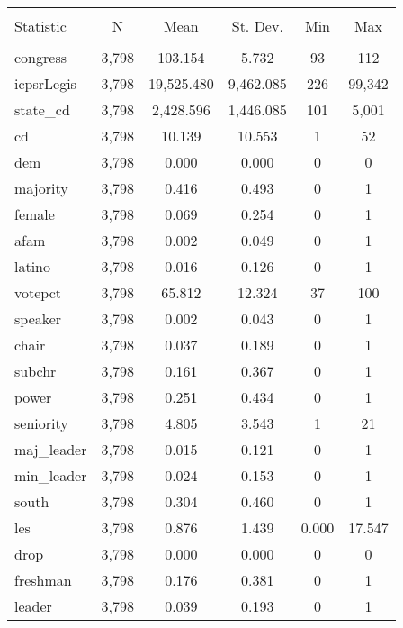 \documentclass[12pt]{article}
\begin{document}
\begin{table}[!htbp] \centering 
	\caption{} 
	\label{} 
	\begin{tabular}{@{\extracolsep{5pt}}lccccc} 
		\\[-1.8ex]\hline 
		\hline \\[-1.8ex] 
		Statistic & \multicolumn{1}{c}{N} & \multicolumn{1}{c}{Mean} & \multicolumn{1}{c}{St. Dev.} & \multicolumn{1}{c}{Min} & \multicolumn{1}{c}{Max} \\ 
		\hline \\[-1.8ex] 
		congress & 3,798 & 103.154 & 5.732 & 93 & 112 \\ 
		icpsrLegis & 3,798 & 19,525.480 & 9,462.085 & 226 & 99,342 \\ 
		state\_cd & 3,798 & 2,428.596 & 1,446.085 & 101 & 5,001 \\ 
		cd & 3,798 & 10.139 & 10.553 & 1 & 52 \\ 
		dem & 3,798 & 0.000 & 0.000 & 0 & 0 \\ 
		majority & 3,798 & 0.416 & 0.493 & 0 & 1 \\ 
		female & 3,798 & 0.069 & 0.254 & 0 & 1 \\ 
		afam & 3,798 & 0.002 & 0.049 & 0 & 1 \\ 
		latino & 3,798 & 0.016 & 0.126 & 0 & 1 \\ 
		votepct & 3,798 & 65.812 & 12.324 & 37 & 100 \\ 
		speaker & 3,798 & 0.002 & 0.043 & 0 & 1 \\ 
		chair & 3,798 & 0.037 & 0.189 & 0 & 1 \\ 
		subchr & 3,798 & 0.161 & 0.367 & 0 & 1 \\ 
		power & 3,798 & 0.251 & 0.434 & 0 & 1 \\ 
		seniority & 3,798 & 4.805 & 3.543 & 1 & 21 \\ 
		maj\_leader & 3,798 & 0.015 & 0.121 & 0 & 1 \\ 
		min\_leader & 3,798 & 0.024 & 0.153 & 0 & 1 \\ 
		south & 3,798 & 0.304 & 0.460 & 0 & 1 \\ 
		les & 3,798 & 0.876 & 1.439 & 0.000 & 17.547 \\ 
		drop & 3,798 & 0.000 & 0.000 & 0 & 0 \\ 
		freshman & 3,798 & 0.176 & 0.381 & 0 & 1 \\ 
		leader & 3,798 & 0.039 & 0.193 & 0 & 1 \\ 

\end{tabular}
\end{table}
\end{document}
